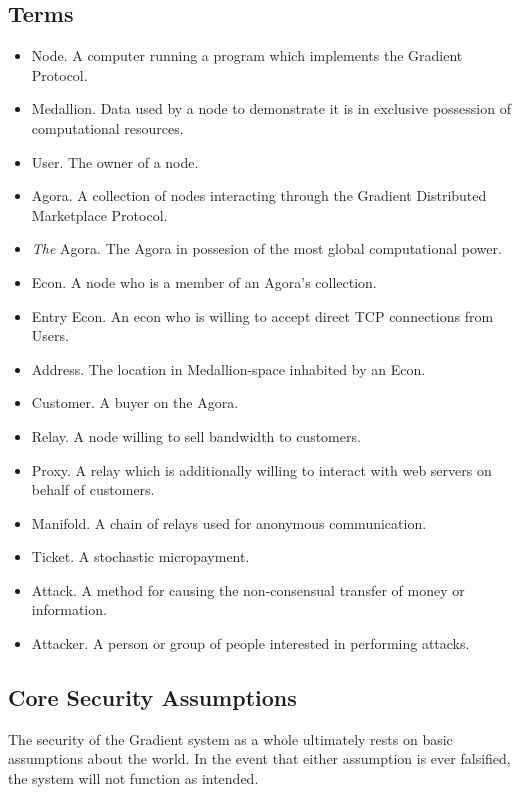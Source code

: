 \documentclass{article}
\begin{document}
\subsection{Terms}

\begin{itemize}
    \item Node. A computer running a program which implements the Gradient Protocol.
    \item Medallion. Data used by a node to demonstrate it is in exclusive possession of computational resources.
    \item User. The owner of a node.
    \item Agora. A collection of nodes interacting through the Gradient Distributed Marketplace Protocol.
    \item \emph{The} Agora. The Agora in possesion of the most global computational power.
    \item Econ. A node who is a member of an Agora's collection.
    \item Entry Econ. An econ who is willing to accept direct TCP connections from Users.
    \item Address. The location in Medallion-space inhabited by an Econ.
    \item Customer. A buyer on the Agora.
    \item Relay. A node willing to sell bandwidth to customers.
    \item Proxy. A relay which is additionally willing to interact with web servers on behalf of customers.
    \item Manifold. A chain of relays used for anonymous communication.
    \item Ticket. A stochastic micropayment.
    \item Attack. A method for causing the non-consensual transfer of money or information.
    \item Attacker. A person or group of people interested in performing attacks.
\end{itemize}

\subsection{Core Security Assumptions}
\label{core-security}

The security of the Gradient system as a whole ultimately rests on basic assumptions about the world. In the event that either assumption is ever falsified, the system will not function as intended.
\end{document}
